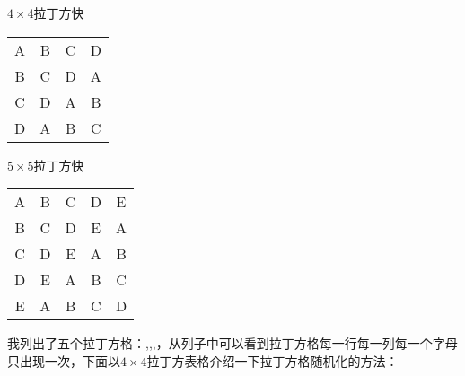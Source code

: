 \begin{margintable}
  \caption{$4\times 4$拉丁方快}
    \begin{tabular}{cccc}
    A     & B     & C     & D \\
    B     & C     & D     & A \\
    C     & D     & A     & B \\
    D     & A     & B     & C \\
    \end{tabular}
\end{margintable}

\begin{margintable}
  \caption{$5\times 5$拉丁方快}
    \begin{tabular}{ccccc}
    A     & B     & C     & D     & E \\
    B     & C     & D     & E     & A \\
    C     & D     & E     & A     & B \\
    D     & E     & A     & B     & C \\
    E     & A     & B     & C     & D \\
    \end{tabular}
\end{margintable}

我列出了五个拉丁方格：,,,，从列子中可以看到拉丁方格每一行每一列每一个字母只出现一次，下面以$4\times 4$拉丁方表格介绍一下拉丁方格随机化的方法：

